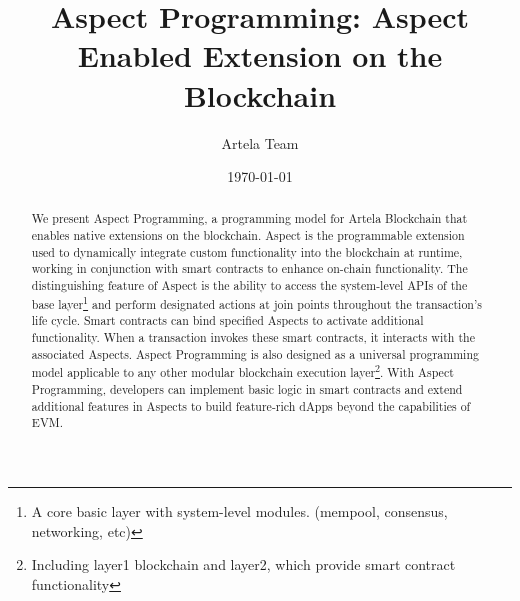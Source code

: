 \documentclass{article}
\begin{document}
\title{Aspect Programming: Aspect Enabled Extension on the Blockchain}
\author{Artela Team}
\date{\today}


\maketitle

\begin{abstract}
    We present Aspect Programming, a programming model for Artela Blockchain\cite{artela2023} that enables native extensions on the blockchain. Aspect is the programmable extension used to dynamically integrate custom functionality into the blockchain at runtime, working in conjunction with smart contracts to enhance on-chain functionality. The distinguishing feature of Aspect is the ability to access the system-level APIs of the base layer\footnote{A core basic layer with system-level modules. (mempool, consensus, networking, etc)} and perform designated actions at join points throughout the transaction's life cycle. Smart contracts can bind specified Aspects to activate additional functionality. When a transaction invokes these smart contracts, it interacts with the associated Aspects. Aspect Programming is also designed as a universal programming model applicable to any other modular blockchain execution layer\footnote{Including layer1 blockchain and layer2, which provide smart contract functionality}. With Aspect Programming, developers can implement basic logic in smart contracts and extend additional features in Aspects to build feature-rich dApps beyond the capabilities of EVM\cite{wood2014ethereum}.
\end{abstract}

\newpage
\tableofcontents
\newpage









\newpage




 
\end{document}
